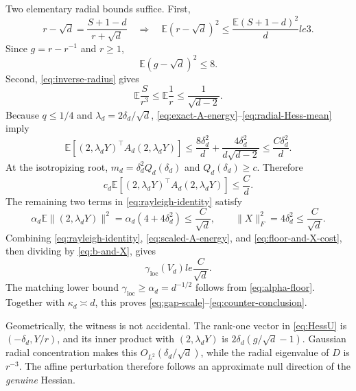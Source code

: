 \documentclass[11pt]{article}
\numberwithin{equation}{section}
\newcommand{\E}{\mathbb E}
\newcommand{\loc}{\mathrm{loc}}
\begin{document}
Two elementary radial bounds suffice.  First,
\begin{equation}\label{eq:r-centered}
  r-\sqrt d=\frac{S+1-d}{r+\sqrt d}
  \quad\Longrightarrow\quad
  \E(r-\sqrt d)^2\le\frac{\E(S+1-d)^2}{d}le3.
\end{equation}
Since $g=r-r^{-1}$ and $r\ge1$,
\begin{equation}\label{eq:g-centered}
  \E(g-\sqrt d)^2\le8.
\end{equation}
Second, \eqref{eq:inverse-radius} gives
\begin{equation}\label{eq:radial-Hess-mean}
  \E\frac{S}{r^3}\le\E\frac1r\le\frac1{\sqrt{d-2}}.
\end{equation}
Because $q\le1/4$ and $\lambda_d=2\delta_d/\sqrt d$,
\eqref{eq:exact-A-energy}--\eqref{eq:radial-Hess-mean} imply
\begin{equation}\label{eq:A-energy-bound}
  \E[(2,\lambda_dY)^\top A_d(2,\lambda_dY)]
  \le\frac{8\delta_d^2}{d}
      +\frac{4\delta_d^2}{d\sqrt{d-2}}
  \le\frac{C\delta_d^2}{d}.
\end{equation}
At the isotropizing root, $m_d=\delta_d^2Q_d(\delta_d)$ and
$Q_d(\delta_d)\ge c$.  Therefore
\begin{equation}\label{eq:scaled-A-energy}
  c_d\E[(2,\lambda_dY)^\top A_d(2,\lambda_dY)]
  \le\frac Cd.
\end{equation}
The remaining two terms in \eqref{eq:rayleigh-identity} satisfy
\begin{equation}\label{eq:floor-and-X-cost}
  \alpha_d\E\lVert(2,\lambda_dY)\rVert^2
  =\alpha_d(4+4\delta_d^2)\le\frac C{\sqrt d},
  \qquad
  \lVert X\rVert_F^2=4\delta_d^2\le\frac C{\sqrt d}.
\end{equation}
Combining \eqref{eq:rayleigh-identity}, \eqref{eq:scaled-A-energy}, and
\eqref{eq:floor-and-X-cost}, then dividing by
\eqref{eq:b-and-X}, gives
\begin{equation}\label{eq:gap-upper}
  \gamma_{\loc}(V_d)le\frac C{\sqrt d}.
\end{equation}
The matching lower bound $\gamma_{\loc}\ge\alpha_d=d^{-1/2}$ follows from
\eqref{eq:alpha-floor}.  Together with $\kappa_d\asymp d$, this proves
\eqref{eq:gap-scale}--\eqref{eq:counter-conclusion}.

Geometrically, the witness is not accidental.  The rank-one vector in
\eqref{eq:HessU} is $(-\delta_d,Y/r)$, and its inner product with
$(2,\lambda_dY)$ is
$2\delta_d(g/\sqrt d-1)$.  Gaussian radial concentration makes this
$O_{L^2}(\delta_d/\sqrt d)$, while the radial eigenvalue of $D$ is $r^{-3}$.
The affine perturbation therefore follows an approximate null direction of the
\emph{genuine} Hessian.
\end{document}
